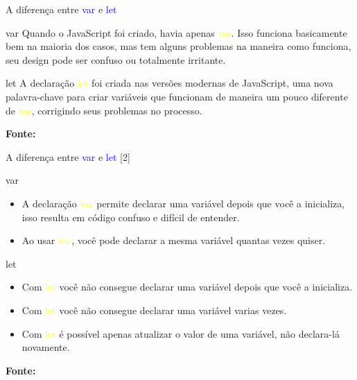 \documentclass{beamer}
\begin{document}
    \begin{frame}{A diferença entre \textcolor{blue}{var} e \textcolor{blue}{let}}
    \begin{block}{var}
    Quando o JavaScript foi criado, havia apenas \textcolor{yellow}{var}. Isso funciona basicamente bem na maioria dos casos, mas tem alguns problemas na maneira como funciona, seu design pode ser confuso ou totalmente irritante.
    \end{block}
    
    \begin{block}{let}
    A declaração \textcolor{yellow}{let} foi criada nas versões modernas de JavaScript, uma nova palavra-chave para criar variáveis que funcionam de maneira um pouco diferente de \textcolor{yellow}{var}, corrigindo seus problemas no processo.
    \end{block}
    \centering
    \tiny{\textbf{Fonte:} \cite{moziladev2022js}}
    \end{frame}
    
\begin{frame}{A diferença entre \textcolor{blue}{var} e \textcolor{blue}{let} [2]}
    \begin{block}{var}
    \begin{itemize}
        \item A declaração \textcolor{yellow}{var} permite declarar uma variável depois que você a inicializa, isso resulta em código confuso e difícil de entender.
        \item Ao usar \textcolor{yellow}{var}, você pode declarar a mesma variável quantas vezes quiser. 
    \end{itemize}
    \end{block}
    
    \begin{block}{let}
    \begin{itemize}
        \item Com \textcolor{yellow}{let} você não consegue declarar uma variável depois que você a inicializa. 
        \item Com \textcolor{yellow}{let} você não consegue declarar uma variável varias vezes. 
        \item Com \textcolor{yellow}{let} é possível apenas atualizar o valor de uma variável, não declara-lá novamente.
    \end{itemize}
    \end{block}
    \centering
    \tiny{\textbf{Fonte:} \cite{moziladev2022js}}
\end{frame}
\end{document}
